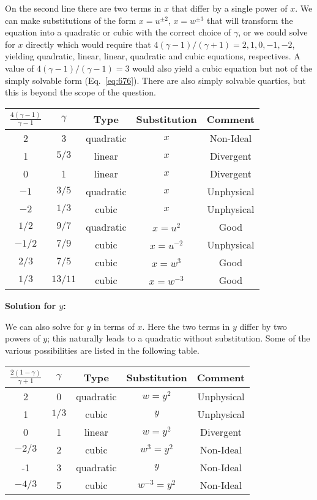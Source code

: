 \documentclass{article}
\begin{document}
\begin{enumerate}
On the second line there are two terms in $x$ that differ by a
single power of $x$.  We can make substitutions of the form $x=u^{\pm 2}$,
$x=w^{\pm 3}$ that will transform the equation into a quadratic or cubic
with the correct choice of $\gamma$, or we could solve for $x$ directly
which would require that $4(\gamma-1)/(\gamma+1)=2,1,0,-1,-2$,
yielding quadratic, linear, linear, quadratic and cubic equations,
respectives.  A value of $4(\gamma-1)/(\gamma-1)=3$ would also yield a
cubic equation but not of the simply solvable form
(Eq.~\ref{eq:676}).  There are also simply solvable quartics, but this
is beyond the scope of the question.
\begin{table}[h]
\centering
\begin{tabular}{ccccc}
$\frac{4(\gamma-1)}{\gamma-1}$ & $\gamma$ & Type & Substitution & Comment \\ \hline
2 & 3 & quadratic & $x$ & Non-Ideal \\
1 & $5/3$ & linear & $x$ & Divergent \\
0 & 1 & linear & $x$ & Divergent \\
$-1$ & $3/5$ & quadratic & $x$ & Unphysical\\
$-2$ & $1/3$ & cubic & $x$ & Unphysical \\
$1/2$  & $9/7$ & quadratic & $x=u^2$ & Good \\
$-1/2$ & $7/9$ & cubic & $x=u^{-2}$ & Unphysical  \\
$2/3$ & $7/5$ & cubic & $x=w^3$ & Good \\
$1/3$ & $13/11$ & cubic & $x=w^{-3}$ & Good \\
\end{tabular} 
\end{table}

{\bf Solution for $y$:}

We can also solve for $y$ in terms of $x$.  Here the two terms in $y$
differ by two powers of $y$; this naturally leads to a quadratic
without substitution.  Some of the various possibilities are listed in
the following table.
\begin{table}[h]
\centering
\begin{tabular}{ccccc}
$\frac{2(1-\gamma)}{\gamma+1}$ & $\gamma$ & Type & Substitution &
Comment \\ \hline
2 & 0 & quadratic & $w=y^2$ & Unphysical \\
1 & $1/3$ & cubic & $y$ & Unphysical \\
0 & 1 & linear & $w=y^2$ & Divergent \\
$-2/3$ & 2 & cubic & $w^3=y^2$ & Non-Ideal \\
-1 & 3 & quadratic & $y$ & Non-Ideal \\
$-4/3$ & 5 & cubic & $w^{-3}=y^2$ & Non-Ideal \\
\end{tabular} 
\end{table}


\end{enumerate}
\end{document}

